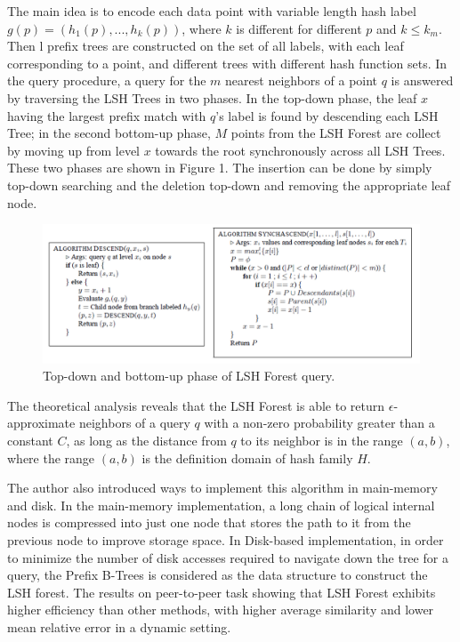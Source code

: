 The main idea is to encode each data point with variable length hash label $g(p)=(h_1(p), ..., h_k(p))$, where $k$ is different for different $p$ and $k\leq k_m$. Then l prefix trees are constructed on the set of all labels, with each leaf corresponding to a point, and different trees with different hash function sets. In the query procedure, a query for the $m$ nearest neighbors of a point $q$ is answered by traversing the LSH Trees in two phases. In the top-down phase, the leaf $x$ having the largest prefix match with $q$'s label is found by descending each LSH Tree; in the second bottom-up phase, $M$ points from the LSH Forest are collect by moving up from level $x$ towards the root synchronously across all LSH Trees. These two phases are shown in Figure 1. The insertion can be done by simply top-down searching and the deletion top-down and removing the appropriate leaf node.
\begin{figure}
	\begin{center}
		\includegraphics[width=6in]{./image/1.png}
		\caption{Top-down and bottom-up phase of LSH Forest query.}
	\end{center}
\end{figure}

The theoretical analysis reveals that the LSH Forest is able to return $\epsilon$-approximate neighbors of a query $q$ with a non-zero probability greater than a constant $C$, as long as the distance from $q$ to its neighbor is in the range $(a,b)$, where the range $(a,b)$ is the definition domain of hash family $H$. 

The author also introduced ways to implement this algorithm in main-memory and disk. In the main-memory implementation, a long chain of logical internal nodes is compressed into just one node that stores the path to it from the previous node to improve storage space. In Disk-based implementation, in order to minimize the number of disk accesses required to navigate down the tree for a query, the Prefix B-Trees is considered as the data structure to construct the LSH forest. The results on peer-to-peer task showing that LSH Forest exhibits higher efficiency than other methods, with higher average similarity and lower mean relative error in a dynamic setting.
